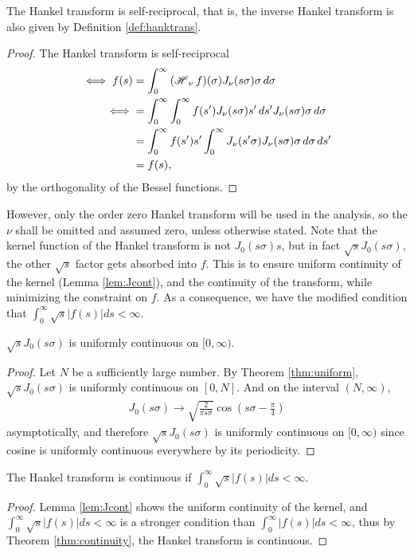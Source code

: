 \begin{corollary}
\label{def:invhanktrans}
The Hankel transform is self-reciprocal, that is, the inverse Hankel transform is also given by Definition \ref{def:hanktrans}.
\end{corollary}
\begin{proof}
The Hankel transform is self-reciprocal
\begin{align*}
\iff f(s) &= \int_0^\infty \Hank[\nu]{f}(\sigma) J_\nu(s \sigma) \sigma \, d\sigma \\
\iff &= \int_0^\infty \int_0^\infty f(s') J_\nu(s \sigma) s' \, ds' J_\nu(s \sigma) \sigma \, d\sigma \\
&= \int_0^\infty f(s') s' \int_0^\infty J_\nu(s' \sigma) J_\nu(s \sigma) \sigma \, d\sigma \, ds' \\
&= f(s),
\end{align*}
by the orthogonality of the Bessel functions.
\end{proof}

However, only the order zero Hankel transform will be used in the analysis, so the $\nu$ shall be omitted and assumed zero, unless otherwise stated. Note that the kernel function of the Hankel transform is not $J_0 (s \sigma) s$, but in fact $\sqrt{s} J_0 (s \sigma)$, the other $\sqrt{s}$ factor gets absorbed into $f$. This is to ensure uniform continuity of the kernel (Lemma \ref{lem:Jcont}), and the continuity of the transform, while minimizing the constraint on $f$. As a consequence, we have the modified condition that $\int_0^\infty \sqrt{s}|f(s)| ds < \infty$.

\begin{lemma}
$\sqrt{s}J_0(s \sigma)$ is uniformly continuous on $[0,\infty)$.
\label{lem:Jcont}
\end{lemma}
\begin{proof}
Let $N$ be a sufficiently large number. By Theorem \ref{thm:uniform}, $\sqrt{s}J_0(s \sigma)$ is uniformly continuous on $[0,N]$. And on the interval $(N,\infty)$,
\begin{align*}
J_0(s \sigma) \rightarrow \sqrt{\frac{2}{\pi s \sigma}} \cos \left( s \sigma - \frac{\pi}{4} \right)
\end{align*}
asymptotically, and therefore $\sqrt{s}J_0(s \sigma)$ is uniformly continuous on $[0,\infty)$ since cosine is uniformly continuous everywhere by its periodicity.
\end{proof}

\begin{theorem}
The Hankel transform is continuous if $\int_0^\infty \sqrt{s}|f(s)| ds < \infty$.
\end{theorem}
\begin{proof}
Lemma \ref{lem:Jcont} shows the uniform continuity of the kernel, and $\int_0^\infty \sqrt{s}|f(s)| ds < \infty$ is a stronger condition than $\int_0^\infty |f(s)| ds < \infty$, thus by Theorem \ref{thm:continuity}, the Hankel transform is continuous.
\end{proof}

